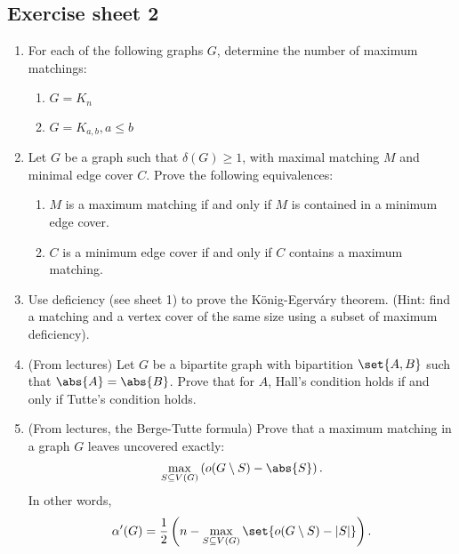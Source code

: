 \subsection*{Exercise sheet 2}
\begin{enumerate}
    \item For each of the following graphs $G$, determine the number of maximum matchings:
    \begin{enumerate}
        \item $G = K_n$
        \item $G = K_{a,b}, a \leq b$
    \end{enumerate}
    
    \item Let $G$ be a graph such that $\delta(G) \geq 1$, with maximal matching $M$ and minimal edge cover $C$. 
    Prove the following equivalences:
    \begin{enumerate}
        \item $M$ is a maximum matching if and only if $M$ is contained in a minimum edge cover.
        \item $C$ is a minimum edge cover if and only if $C$ contains a maximum matching.
    \end{enumerate}
    
    \item Use deficiency (see sheet 1) to prove the König-Egerváry theorem. 
    (Hint: find a matching and a vertex cover of the same size using a subset of maximum deficiency).
    
    \item (From lectures) Let $G$ be a bipartite graph with bipartition $\set{A, B}$ such that $\abs{A} = \abs{B}$. 
    Prove that for $A$, Hall's condition holds if and only if Tutte's condition holds.
    
    \item (From lectures, the Berge-Tutte formula) Prove that a maximum matching in a graph $G$ 
    leaves uncovered exactly:
    \[
    \max_{S \subseteq V(G)} \left(o(G \setminus S) - \abs{S}\right).
    \]
    In other words,
    \[
    \alpha'(G) = \frac{1}{2}\left(n - \max_{S \subseteq V(G)} \set{o(G \setminus S) - |S|}\right).
    \]
\end{enumerate}

